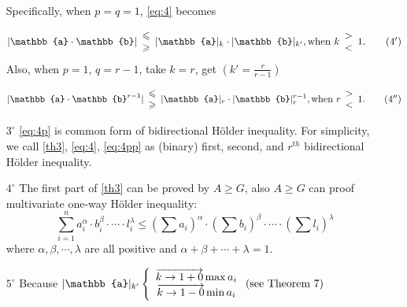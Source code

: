 \documentclass[12pt,a4paper,reqno]{amsart}
\theoremstyle{plain}
\theoremstyle{definition}
\begin{document}
\begin{enumerate}
Specifically, when $p=q=1$, \eqref{eq:4} becomes 

\begin{equation}\label{eq:4p}
  | \mathbb{a}\cdot\mathbb{b}|\begin{array}{c}
  \leqslant \\ 
  \geqslant    
  \end{array}
  |\mathbb{a}|_k \cdot | \mathbb{b}|_{k'}, \textnormal{when}~k
  \begin{array}{l}
    >  \\  
    <      
  \end{array}
  1.  \tag{$4'$} 
\end{equation}
Also, when $p=1$, $q=r-1$, take $k=r$, get $(k'=\frac{r}{r-1})$ 

\begin{equation}\label{eq:4pp}
  | \mathbb{a}\cdot\mathbb{b}^{r-1}|\begin{array}{c}
  \leqslant \\ 
  \geqslant    
  \end{array}
  |\mathbb{a}|_r \cdot | \mathbb{b}|_r^{r-1}, \textnormal{when}~r
  \begin{array}{l}
    >  \\  
    <      
  \end{array}
  1.  \tag{$4''$} 
\end{equation}

\item [$3^{\circ}$] \eqref{eq:4p} is common form of bidirectional H\"older inequality. For simplicity, we call \eqref{th3}, \eqref{eq:4}, \eqref{eq:4pp} as (binary) first, second, and $r^{th}$ bidirectional H\"older inequality.  

\item [$4^{\circ}$] The first part of \eqref{th3} can be proved by $A\geqslant G$, also $A\geqslant G$ can proof multivariate one-way H\"older inequality:
\begin{equation}\label{eq:5}
  \sum_{i=1}^n a_i^{\alpha}\cdot b_i^{\beta}\cdot \cdots \cdot l_i^{\lambda} \leqslant\left(\sum a_i\right)^{\alpha} \cdot \left(\sum b_i\right)^{\beta}\cdot \cdots \cdot \left(\sum l_i\right)^{\lambda}
\end{equation}
where $\alpha, \beta, \cdots, \lambda$ are all positive and $\alpha + \beta + \cdots + \lambda = 1$. 

\item [$5^{\circ}$] Because $|\mathbb{a}|_{k'} \left\{ \begin{array}{c}
  \overrightarrow{k\to 1+0} \max a_i \\ 
  \overrightarrow{k\to 1-0} \min a_i \end{array}\right.  \textnormal{(see Theorem 7)}$


\end{enumerate}
\end{document}
